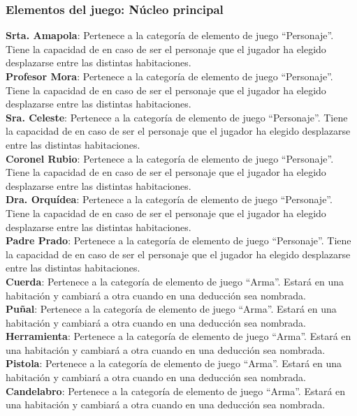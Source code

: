 \subsubsection{Elementos del juego: Núcleo principal}
\textbf{Srta. Amapola}: Pertenece a la categoría de elemento de juego “Personaje”. Tiene la capacidad de en caso de ser el personaje que el jugador ha elegido desplazarse entre las distintas habitaciones.\\
\textbf{Profesor Mora}: Pertenece a la categoría de elemento de juego “Personaje”. Tiene la capacidad de en caso de ser el personaje que el jugador ha elegido desplazarse entre las distintas habitaciones.\\
\textbf{Sra. Celeste}: Pertenece a la categoría de elemento de juego “Personaje”. Tiene la capacidad de en caso de ser el personaje que el jugador ha elegido desplazarse entre las distintas habitaciones.\\
\textbf{Coronel Rubio}: Pertenece a la categoría de elemento de juego “Personaje”. Tiene la capacidad de en caso de ser el personaje que el jugador ha elegido desplazarse entre las distintas habitaciones.\\
\textbf{Dra. Orquídea}: Pertenece a la categoría de elemento de juego “Personaje”. Tiene la capacidad de en caso de ser el personaje que el jugador ha elegido desplazarse entre las distintas habitaciones.\\
\textbf{Padre Prado}: Pertenece a la categoría de elemento de juego “Personaje”. Tiene la capacidad de en caso de ser el personaje que el jugador ha elegido desplazarse entre las distintas habitaciones.\\
\textbf{Cuerda}: Pertenece a la categoría de elemento de juego “Arma”. Estará en una habitación y cambiará a otra cuando en una deducción sea nombrada.\\
\textbf{Puñal}: Pertenece a la categoría de elemento de juego “Arma”. Estará en una habitación y cambiará a otra cuando en una deducción sea nombrada.\\
\textbf{Herramienta}: Pertenece a la categoría de elemento de juego “Arma”. Estará en una habitación y cambiará a otra cuando en una deducción sea nombrada.\\
\textbf{Pistola}: Pertenece a la categoría de elemento de juego “Arma”. Estará en una habitación y cambiará a otra cuando en una deducción sea nombrada.\\
\textbf{Candelabro}: Pertenece a la categoría de elemento de juego “Arma”. Estará en una habitación y cambiará a otra cuando en una deducción sea nombrada.\\
